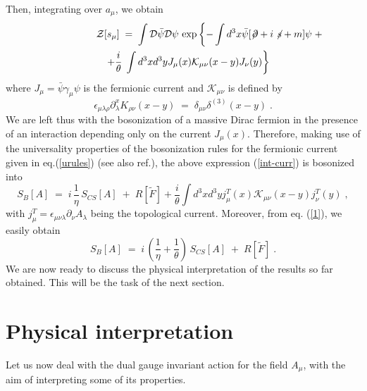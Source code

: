 \documentclass[a4paper,12pt]{article}
\begin{document}
Then, integrating over $a_\mu$, we obtain
\begin{eqnarray}
\lefteqn{  {\mathcal Z}[s_\mu]\;=\; \int  {\mathcal
    D}{\bar\psi} {\mathcal D}\psi \, \exp \left\{- \int d^3x{\bar\psi}
[\not \! \partial +  i \not \! s + m ] \psi \right. + \nonumber}\\
&&\left. +\frac{i}{\theta}\; \int d^3x d^3y J_\mu(x) {\mathcal K}_{\mu\nu}(x-y) J_\nu(y)
\right\}
\label{int-curr}
\end{eqnarray}
where $J_\mu ={\bar\psi} \gamma_\mu \psi$ is the fermionic current and ${\mathcal
  K}_{\mu\nu}$ is defined by
\begin{equation}
\epsilon_{\mu\lambda\rho} \partial^x_\lambda K_{\rho\nu}(x-y)
\;=\;\delta_{\mu\nu} \delta^{(3)} (x-y) \;.
\label{1}
\end{equation}
We are left thus with the bosonization of a massive Dirac fermion in
the presence of an interaction depending only on the current $J_\mu(x)$.
Therefore, making use of the universality properties of the
bosonization rules for the fermionic current given in
eq.(\ref{urules}) (see also ref.\cite{result6}), the above expression
(\ref{int-curr}) is bosonized into
\begin{equation}
S_B[A]\;=\; i \,\frac{1}{\eta} \,S_{CS}[A]\;+\;R[\widetilde{F}] +  \frac{i}{\theta}\int d^3x d^3y j_\mu^T(x) {\mathcal K}_{\mu\nu}(x-y) j_\nu^T(y)
\;,
\label{stat-bos}
\end{equation}
with $j_\mu^T = \epsilon_{\mu\nu\lambda} \partial_{\nu}A_{\lambda} $ being the topological current.
Moreover, from eq. (\ref{1}), we easily obtain
\begin{equation}
S_B[A]\;=\; i \,(\frac{1}{\eta} + \frac{1}{\theta})\,S_{CS}[A]\;+\;R[\widetilde{F}]
\;.
\label{stat-fin}
\end{equation}
We are now ready to discuss the physical interpretation of the results
so far obtained.
This will be the task of the next section.


\section{Physical interpretation}\label{inter}
Let us now deal with the dual gauge invariant action for the field
$A_\mu$, with the aim of interpreting some of its properties.
\end{document}
